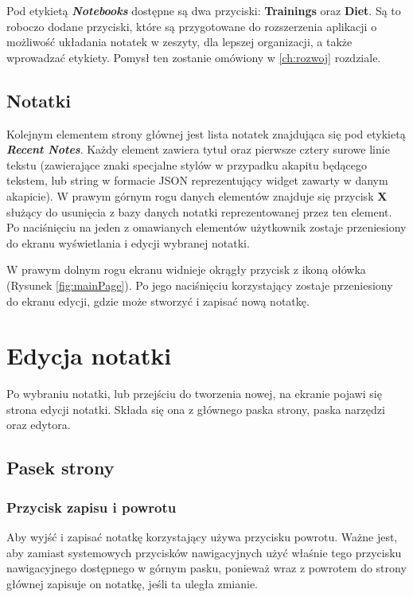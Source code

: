Pod etykietą \textbf{\textit{Notebooks}} dostępne są dwa przyciski: \textbf{Trainings} oraz \textbf{Diet}. Są to roboczo dodane przyciski, które są przygotowane do rozszerzenia aplikacji o możliwość układania notatek w zeszyty, dla lepszej organizacji, a także wprowadzać etykiety.
Pomysł ten zostanie omówiony w \ref{ch:rozwoj} rozdziale.

\subsection{Notatki}

Kolejnym elementem strony głównej jest lista notatek znajdująca się pod etykietą \textbf{\textit{Recent Notes}}. Każdy element zawiera tytuł oraz pierwsze cztery surowe linie tekstu (zawierające znaki specjalne stylów w przypadku akapitu będącego tekstem, lub string w formacie JSON reprezentujący widget zawarty w danym akapicie).
W prawym górnym rogu danych elementów znajduje się przycisk \textbf{X} służący do usunięcia z bazy danych notatki reprezentowanej przez ten element.
Po naciśnięciu na jeden z omawianych elementów użytkownik zostaje przeniesiony do ekranu wyświetlania i edycji wybranej notatki.

W prawym dolnym rogu ekranu widnieje okrągły przycisk z ikoną ołówka (Rysunek \ref{fig:mainPage}).
Po jego naciśnięciu korzystający zostaje przeniesiony do ekranu edycji, gdzie może stworzyć i zapisać nową notatkę.

\section{Edycja notatki}

Po wybraniu notatki, lub przejściu do tworzenia nowej, na ekranie pojawi się strona edycji notatki. Składa się ona z głównego paska strony, paska narzędzi oraz edytora.

\subsection{Pasek strony}

\subsubsection{Przycisk zapisu i powrotu}

Aby wyjść i zapisać notatkę korzystający używa przycisku powrotu.
Ważne jest, aby zamiast systemowych przycisków nawigacyjnych użyć właśnie tego przycisku nawigacyjnego dostępnego w górnym pasku, ponieważ wraz z powrotem do strony głównej zapisuje on notatkę, jeśli ta uległa zmianie.

